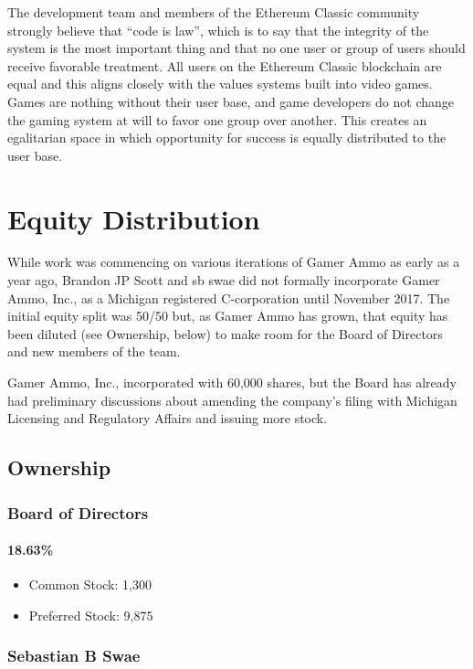 \documentclass[11pt]{report}
\begin{document}
The development team and members of the Ethereum Classic community strongly believe that ``code is law''\cite{code-is-law}, which is to say that the integrity of the system is the most important thing and that no one user or group of users should receive favorable treatment. All users on the Ethereum Classic blockchain are equal and this aligns closely with the values systems built into video games. Games are nothing without their user base, and game developers do not change the gaming system at will to favor one group over another. This creates an egalitarian space in which opportunity for success is equally distributed to the user base.

\chapter{Equity Distribution}

While work was commencing on various iterations of Gamer Ammo as early as a year ago, Brandon JP Scott and sb swae did not formally incorporate Gamer Ammo, Inc., as a Michigan registered C-corporation until November 2017. The initial equity split was 50/50 but, as Gamer Ammo has grown, that equity has been diluted (see Ownership, below) to make room for the Board of Directors and new members of the team.

Gamer Ammo, Inc., incorporated with 60,000 shares, but the Board has already had preliminary discussions about amending the company's filing with Michigan Licensing and Regulatory Affairs and issuing more stock.

\section{Ownership}
\subsection{Board of Directors}
	\subsubsection{\textbf{18.63\%}}
	\begin{itemize}
		\item Common Stock: 1,300
		\item Preferred Stock: 9,875
	\end{itemize}
\subsection{Sebastian B Swae}
\end{document}
